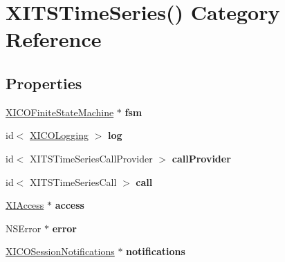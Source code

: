 \hypertarget{category_x_i_t_s_time_series_07_08}{}\section{X\+I\+T\+S\+Time\+Series() Category Reference}
\label{category_x_i_t_s_time_series_07_08}
\subsection*{Properties}
\begin{DoxyCompactItemize}
\item 
\hypertarget{category_x_i_t_s_time_series_07_08_a3396bc4590cb5bf9eb36c52d717cf48e}{}\label{category_x_i_t_s_time_series_07_08_a3396bc4590cb5bf9eb36c52d717cf48e} 
\hyperlink{class_x_i_c_o_finite_state_machine}{X\+I\+C\+O\+Finite\+State\+Machine} $\ast$ {\bfseries fsm}
\item 
\hypertarget{category_x_i_t_s_time_series_07_08_a126751f1d50ca1f56c40b88cf019142a}{}\label{category_x_i_t_s_time_series_07_08_a126751f1d50ca1f56c40b88cf019142a} 
id$<$ \hyperlink{protocol_x_i_c_o_logging-p}{X\+I\+C\+O\+Logging} $>$ {\bfseries log}
\item 
\hypertarget{category_x_i_t_s_time_series_07_08_ae826156c2fe6bf899a8d7a345d4321dd}{}\label{category_x_i_t_s_time_series_07_08_ae826156c2fe6bf899a8d7a345d4321dd} 
id$<$ X\+I\+T\+S\+Time\+Series\+Call\+Provider $>$ {\bfseries call\+Provider}
\item 
\hypertarget{category_x_i_t_s_time_series_07_08_a9dd036c7a8570c1f4a98fd57a4173b99}{}\label{category_x_i_t_s_time_series_07_08_a9dd036c7a8570c1f4a98fd57a4173b99} 
id$<$ X\+I\+T\+S\+Time\+Series\+Call $>$ {\bfseries call}
\item 
\hypertarget{category_x_i_t_s_time_series_07_08_afc01387821ab8c8d55c11c26ae25ccce}{}\label{category_x_i_t_s_time_series_07_08_afc01387821ab8c8d55c11c26ae25ccce} 
\hyperlink{class_x_i_access}{X\+I\+Access} $\ast$ {\bfseries access}
\item 
\hypertarget{category_x_i_t_s_time_series_07_08_a4b686abd1b17730af41bf9c784edba78}{}\label{category_x_i_t_s_time_series_07_08_a4b686abd1b17730af41bf9c784edba78} 
N\+S\+Error $\ast$ {\bfseries error}
\item 
\hypertarget{category_x_i_t_s_time_series_07_08_aa7f76fd0e3ed383f1d199731699d9af4}{}\label{category_x_i_t_s_time_series_07_08_aa7f76fd0e3ed383f1d199731699d9af4} 
\hyperlink{interface_x_i_c_o_session_notifications}{X\+I\+C\+O\+Session\+Notifications} $\ast$ {\bfseries notifications}

\end{DoxyCompactItemize}
